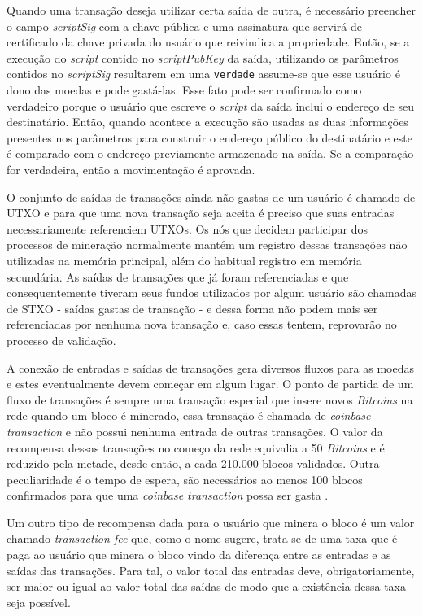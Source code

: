 %
%
%
%
Quando uma transação deseja utilizar certa saída de outra, é necessário preencher o campo \textit{scriptSig} com a chave pública e uma assinatura que servirá de certificado da chave privada do usuário que reivindica a propriedade. Então, se a execução do \textit{script} contido no \textit{scriptPubKey} da saída, utilizando os parâmetros contidos no \textit{scriptSig} resultarem em uma \texttt{verdade} assume-se que esse usuário é dono das moedas e pode gastá-las. Esse fato pode ser confirmado como verdadeiro porque o usuário que escreve o \textit{script} da saída inclui o endereço de seu destinatário. Então, quando acontece a execução são usadas as duas informações presentes nos parâmetros para construir o endereço público do destinatário e este é comparado com o endereço previamente armazenado na saída. Se a comparação for verdadeira, então a movimentação é aprovada.

%
O conjunto de saídas de transações ainda não gastas de um usuário é chamado de \ac{UTXO} e para que uma nova transação seja aceita é preciso que suas entradas necessariamente referenciem \acp{UTXO}. Os nós que decidem participar dos processos de mineração normalmente mantém um registro dessas transações não utilizadas na memória principal, além do habitual registro em memória secundária. As saídas de transações que já foram referenciadas e que consequentemente tiveram seus fundos utilizados por algum usuário são chamadas de \ac{STXO} - saídas gastas de transação - e dessa forma não podem mais ser referenciadas por nenhuma nova transação e, caso essas tentem, reprovarão no processo de validação.

%
A conexão de entradas e saídas de transações gera diversos fluxos para as moedas e estes eventualmente devem começar em algum lugar. O ponto de partida de um fluxo de transações é sempre uma transação especial que insere novos \textit{Bitcoins} na rede quando um bloco é minerado, essa transação é chamada de \textit{coinbase transaction} e não possui nenhuma entrada de outras transações. O valor da recompensa dessas transações no começo da rede equivalia a 50 \textit{Bitcoins} e é reduzido pela metade, desde então, a cada 210.000 blocos validados. Outra peculiaridade é o tempo de espera, são necessários ao menos 100 blocos confirmados para que uma \textit{coinbase transaction} possa ser gasta \cite{blockchain:survey_bitcoin}.

%
Um outro tipo de recompensa dada para o usuário que minera o bloco é um valor chamado \textit{transaction fee} que, como o nome sugere, trata-se de uma taxa que é paga ao usuário que minera o bloco vindo da diferença entre as entradas e as saídas das transações. Para tal, o valor total das entradas deve, obrigatoriamente, ser maior ou igual ao valor total das saídas de modo que a existência dessa taxa seja possível.

